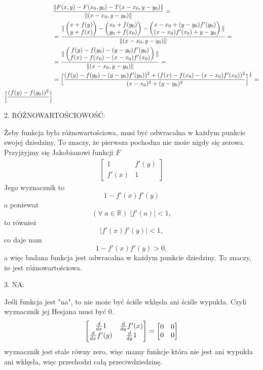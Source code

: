 \documentclass{article}[13pt]
\newcommand{\R}{\mathds{R}}
\begin{document}
\begin{align*}
    &{\|F(x,y)-F(x_0,y_0)-T(x-x_0,y-y_0)\|\over\|(x-x_0,y-y_0)\|}=\\
    &={\|
        \begin{pmatrix}x+f(y)\\y+f(x)\end{pmatrix}
        -\begin{pmatrix}x_0+f(y_0)\\y_0+f(x_0)\end{pmatrix}-
        \begin{pmatrix}
            x-x_0+(y-y_0)f'(y_0)\\
            (x-x_0)f'(x_0)+y-y_0
        \end{pmatrix}
    \|\over\|(x-x_0,y-y_0)\|}=\\
    &={\|
        \begin{pmatrix}
            f(y)-f(y_0)-(y-y_0)f'(y_0)\\
            f(x)-f(x_0)-(x-x_0)f'(x_0)
        \end{pmatrix}
        \|\over
        \|(x-x_0,y-y_0)\|
    }=\\
    &=\Big[{{(f(y)-f(y_0)-(y-y_0)f'(y_0))^2+(f(x)-f(x_0)-(x-x_0)f'(x_0))^2\over(x-x_0)^2+(y-y_0)^2}}\Big]^\frac12=\\
    \Big[{(f(y)-f(y_0))^2\over}\Big]
\end{align*}

\medskip


{\color{red}2. RÓŻNOWARTOŚCIOWOŚĆ:}
\medskip

Żeby funkcja była różnowartościowa, musi być odwracalna w każdym punkcie swojej dziedziny. To znaczy, że pierwsza pochodna nie może nigdy się zerowa. Przyjżyjmy się Jakobianowi funkcji $F$
\begin{align*}
    \begin{bmatrix}
        1 & f'(y)\\
        f'(x) & 1
    \end{bmatrix}
\end{align*}
Jego wyznacznik to 
$$1-f'(x)f'(y)$$
a ponieważ 
$$(\forall\;a\in\R)\;|f'(a)|<1,$$
to również
$$|f'(x)f'(y)|<1,$$
co daje nam 
$$1-f'(x)f'(y)>0,$$
a więc badana funkcja jest odwracalna w każdym punkcie dziedziny. To znaczy, że jest różnowartościowa.
\medskip

{\color{red}3. NA:}
\medskip

Jeśli funkcja jest "na", to nie może być ściśle wklęsła ani ściśle wypukła. Czyli wyznacznik jej Hesjana musi być 0.
\begin{align*}
    \begin{bmatrix}
        {d\over dx}1 & {d\over dy} f'(x)\\
        {d\over dx}f'(y) & {d\over dy}1
    \end{bmatrix}=
    \begin{bmatrix}
        0 & 0\\
        0 & 0
    \end{bmatrix}
\end{align*}
wyznacznik jest stale równy zero, więc mamy funkcje która nie jest ani wypukła ani wklęsła, więc przechodzi całą przeciwdziedzinę.
\end{document}
